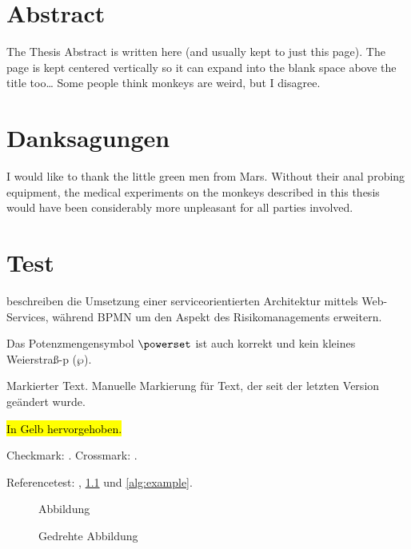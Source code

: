 \documentclass[paper=a5,twoside,fontsize=10pt, DIV=calc, headings=small, bibliography=totoc, listof=totoc]{scrbook}
\theoremstyle{break}
\newcommand{\textmarker}[1]{{\color{red} #1}\xspace}
\newcommand{\modified}[1]{{\color{blue!60!black} #1}\xspace}
\newcommand{\dingcheck}{\ding{51}}
\newcommand{\dingcross}{\ding{55}}
\begin{document}
\chapter*{Abstract}
\begin{otherlanguage}{american}
The Thesis Abstract is written here (and usually kept to just this page). The page is kept centered vertically so it can expand into the blank space above the title too\ldots
Some people think monkeys are weird, but I disagree.
\end{otherlanguage}
\clearpage

\chapter*{Danksagungen}
I would like to thank the little green men from Mars. Without their anal probing equipment, the medical experiments on the monkeys described in this thesis would have been considerably more unpleasant for all parties involved.
\clearpage

\pagestyle{scrheadings}

\chapter{Test}
\label{chap:test}

 beschreiben die Umsetzung einer serviceorientierten Architektur mittels Web-Services, während \citet{zMR2005} BPMN um den Aspekt des Risikomanagements erweitern.

Das Potenzmengensymbol $\powerset$ ist auch korrekt und kein kleines Weierstraß-p ($\wp$).

\textmarker{Markierter Text.}
\modified{Manuelle Markierung für Text, der seit der letzten Version geändert wurde.}

\hl{In Gelb hervorgehoben.}

Checkmark: \dingcheck. Crossmark: \dingcross.

Referencetest: , \cref{fig:Abbildung} und \cref{alg:example}.

\begin{figure}
\missingfigure{}
\caption{Abbildung}
\label{fig:Abbildung}
\end{figure}

\begin{landscape}
\begin{figure}
\missingfigure{}
\caption{Gedrehte Abbildung}
\label{fig:AbbildungGedreht}
\end{figure}
\end{landscape}
\end{document}
